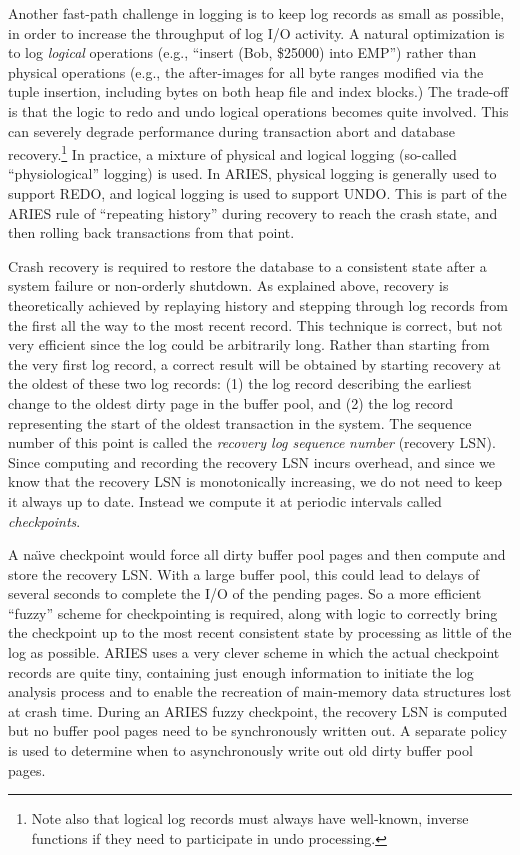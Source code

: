 \documentclass[b5paper,11pt,twoside,openright]{book}
\begin{document}
Another fast-path challenge in logging is to keep log records as small
as possible, in order to increase the throughput of log I/O activity. A
natural optimization is to log \emph{logical} operations (e.g., ``insert
(Bob, \$25000) into EMP'') rather than physical operations (e.g., the
after-images for all byte ranges modified via the tuple insertion,
including bytes on both heap file and index blocks.) The trade-off is
that the logic to redo and undo logical operations becomes quite
involved. This can severely degrade performance during transaction abort
and database recovery.\footnote{Note also that logical log records must always have well-known,
inverse functions if they need to participate in undo processing.} In practice, a mixture of
physical and logical logging (so-called ``physiological'' logging) is
used. In ARIES, physical logging is generally used to support REDO, and
logical logging is used to support UNDO. This is part of the ARIES rule
of ``repeating history'' during recovery to reach the crash state, and
then rolling back transactions from that point.

Crash recovery is required to restore the database to a consistent state
after a system failure or non-orderly shutdown. As explained above,
recovery is theoretically achieved by replaying history and stepping
through log records from the first all the way to the most recent
record. This technique is correct, but not very efficient since the log
could be arbitrarily long. Rather than starting from the very first log
record, a correct result will be obtained by starting recovery at the
oldest of these two log records: (1) the log record describing the
earliest change to the oldest dirty page in the buffer pool, and (2) the
log record representing the start of the oldest transaction in the
system. The sequence number of this point is called the \emph{recovery
log sequence} \emph{number} (recovery LSN). Since computing and
recording the recovery LSN incurs overhead, and since we know that the
recovery LSN is
monotonically increasing, we do not need to keep it always up to date.
Instead we compute it at periodic intervals called \emph{checkpoints}.

A na{\"\i}ve checkpoint would force all dirty buffer pool pages and then
compute and store the recovery LSN. With a large buffer pool, this could
lead to delays of several seconds to complete the I/O of the pending
pages. So a more efficient ``fuzzy'' scheme for checkpointing is
required, along with logic to correctly bring the checkpoint up to the
most recent consistent state by processing as little of the log as
possible. ARIES uses a very clever scheme in which the actual checkpoint
records are quite tiny, containing just enough information to initiate
the log analysis process and to enable the recreation of main-memory
data structures lost at crash time. During an ARIES fuzzy checkpoint,
the recovery LSN is computed but no buffer pool pages need to be
synchronously written out. A separate policy is used to determine when
to asynchronously write out old dirty buffer pool pages.
\end{document}
